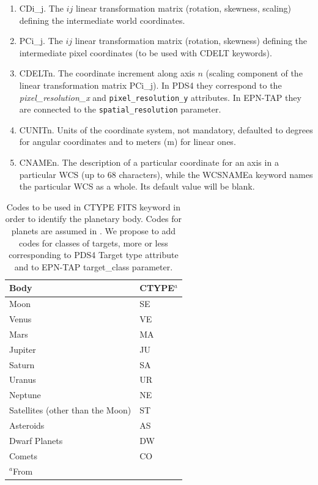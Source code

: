 \begin{enumerate}
{Value of the coordinate specified by the CTYPEn keyword at the reference point CRPIXn.}
\item{CDi\_j.
The $ij$ linear transformation matrix (rotation, skewness, scaling) defining the
intermediate world coordinates.}
\item{PCi\_j.
The $ij$ linear transformation matrix (rotation, skewness) defining the intermediate
pixel coordinates (to be used with CDELT keywords).}
\item{CDELTn.
The coordinate increment along axis $n$ (scaling component of the linear transformation
matrix PCi\_j).
In PDS4 they correspond to the \textit{pixel\_resolution\_x} and
\texttt{pixel\_resolution\_y} attributes.
In EPN-TAP they are connected to the \texttt{spatial\_resolution} parameter.}
\item{CUNITn.
Units of the coordinate system, not mandatory, defaulted to degrees for angular
coordinates and to meters (m) for linear ones.}
\item{CNAMEn.
The description of a particular coordinate for an axis in a particular WCS (up to 68
characters), while the WCSNAMEa keyword names the particular WCS as a whole.
Its default value will be blank.}
\end{enumerate}

\begin{table}
\caption{Codes to be used in CTYPE FITS keyword in order to identify the planetary body.
Codes for planets are assumed in \citet{calagreisenI}.
We propose to add codes for classes of targets,
more or less corresponding to PDS4 Target type attribute and to EPN-TAP
target\_class parameter.}
\centering
\begin{tabular}{l l}
\hline
Body & CTYPE$^{a}$ \\ 
\hline
Moon & SE \\
Venus & VE \\
Mars & MA \\
Jupiter & JU \\
Saturn & SA \\
Uranus & UR \\
Neptune & NE \\
Satellites (other than the Moon) & ST \\
Asteroids & AS \\
Dwarf Planets & DW \\
Comets & CO \\
\hline
\multicolumn{2}{l}{$^{a}$From \citet{calagreisenI}}
\end{tabular}
\label{table:ctype}
\end{table}

